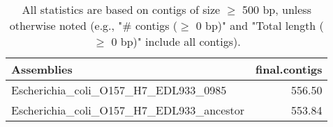\documentclass[12pt,a4paper]{article}
\begin{document}
\begin{table}[ht]
\begin{center}
\caption{All statistics are based on contigs of size $\geq$ 500 bp, unless otherwise noted (e.g., "\# contigs ($\geq$ 0 bp)" and "Total length ($\geq$ 0 bp)" include all contigs).}
\begin{tabular}{|l*{1}{|r}|}
\hline
Assemblies & final.contigs \\ \hline
Escherichia\_coli\_O157\_H7\_EDL933\_0985 & 556.50 \\ \hline
Escherichia\_coli\_O157\_H7\_EDL933\_ancestor & 553.84 \\ \hline
\end{tabular}
\end{center}
\end{table}
\end{document}
